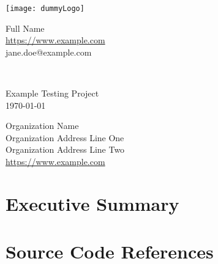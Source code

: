 \documentclass{LeanTestReport}
\begin{document}
\pageOneMargins
\thispagestyle{first}

\setlength{\leftskip}{-0.2in} %
\begin{minipage}[t]{0.55\linewidth}


\begin{minipage}{0.4\linewidth}%
    \vspace{0.08in}%
    \texttt{[image: dummyLogo]}%
  \end{minipage}%
  \begin{minipage}{0.6\linewidth}%
    \begin{flushright}%
    Full Name \\
    \url{https://www.example.com} \\
    jane.doe@example.com \\
    \end{flushright}
  \end{minipage}
\vspace{-0.3cm}~\\
\vspace{0.4cm}\noindent\makebox[\linewidth]{\rule{\linewidth}{0.4pt}}
\noindent%


\begin{center}
{\LARGE Example Testing Project}\\
\today \\
\end{center} 
\vspace{0.35 cm}
Organization Name \\
Organization Address Line One \\
Organization Address Line Two \\
\url{https://www.example.com}

\vspace{0cm}\noindent\makebox[\linewidth]{\rule{\linewidth}{0.4pt}}

\section*{Executive Summary}

\lipsum[1-2]

\section*{Source Code References}


\end{minipage}
\end{document}
